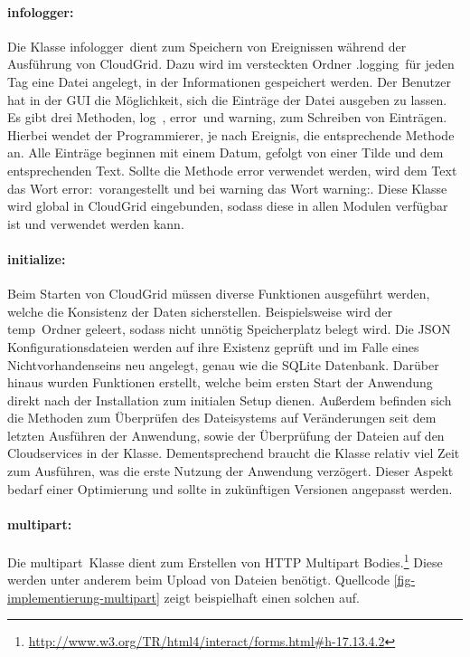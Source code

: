\paragraph{infologger:}
Die Klasse \frqq infologger\flqq\ dient zum Speichern von Ereignissen während der Ausführung von CloudGrid.
Dazu wird im versteckten Ordner \frqq .logging\flqq\ für jeden Tag eine Datei angelegt, in der Informationen gespeichert werden.
Der Benutzer hat in der \ac{GUI} die Möglichkeit, sich die Einträge der Datei ausgeben zu lassen.
Es gibt drei Methoden, \frqq log\flqq\ , \frqq error\flqq\ und \frqq warning\flqq , zum Schreiben von Einträgen.
Hierbei wendet der Programmierer, je nach Ereignis, die entsprechende Methode an.
Alle Einträge beginnen mit einem Datum, gefolgt von einer Tilde und dem entsprechenden Text.
Sollte die Methode error verwendet werden, wird dem Text das Wort \frqq error:\flqq\ vorangestellt und bei warning das Wort \frqq warning:\flqq .
Diese Klasse wird global in CloudGrid eingebunden, sodass diese in allen Modulen verfügbar ist und verwendet werden kann.

\paragraph{initialize:}Beim Starten von CloudGrid müssen diverse Funktionen ausgeführt werden, welche die Konsistenz der Daten sicherstellen.
Beispielsweise wird der \frqq temp\flqq\ Ordner geleert, sodass nicht unnötig Speicherplatz belegt wird.
Die \ac{JSON} Konfigurationsdateien werden auf ihre Existenz geprüft und im Falle eines Nichtvorhandenseins neu angelegt, genau wie die SQLite Datenbank.
Darüber hinaus wurden Funktionen erstellt, welche beim ersten Start der Anwendung direkt nach der Installation zum initialen Setup dienen.
Außerdem befinden sich die Methoden zum Überprüfen des Dateisystems auf Veränderungen seit dem letzten Ausführen der Anwendung, sowie der Überprüfung der Dateien auf den Cloudservices in der Klasse.
Dementsprechend braucht die Klasse relativ viel Zeit zum Ausführen, was die erste Nutzung der Anwendung verzögert.
Dieser Aspekt bedarf einer Optimierung und sollte in zukünftigen Versionen angepasst werden.

\paragraph{multipart:}
Die \frqq multipart\flqq\ Klasse dient zum Erstellen von \ac{HTTP} Multipart Bodies.\footnote{\url{http://www.w3.org/TR/html4/interact/forms.html\#h-17.13.4.2}}
Diese werden unter anderem beim Upload von Dateien benötigt.
Quellcode \ref{fig-implementierung-multipart} zeigt beispielhaft einen solchen auf.

